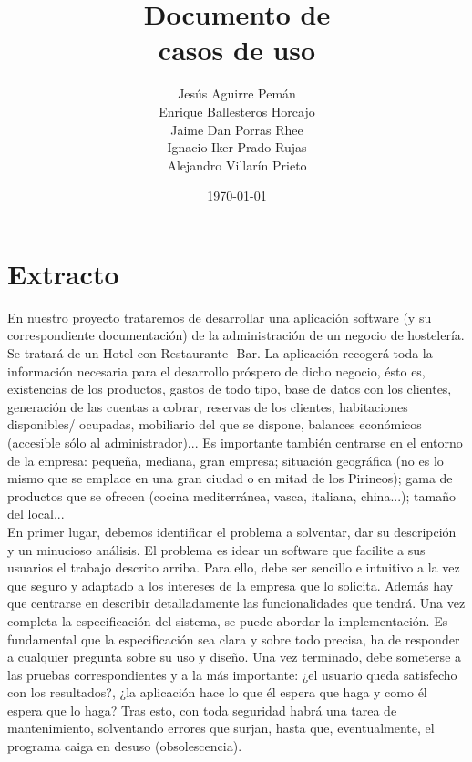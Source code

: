 \documentclass[spanish,a4paper,12pt]{report}		%
\begin{document}
\title{\textbf{\huge{Documento de \\ casos de uso}}}
\author{ Jesús Aguirre Pemán \\
	 Enrique Ballesteros Horcajo \\
	 Jaime Dan Porras Rhee \\
	 Ignacio Iker Prado Rujas \\
	 Alejandro Villarín Prieto }
\date{\today}
\maketitle

\newpage
\mbox{}
\thispagestyle{empty}


\tableofcontents 		%

\newpage
\mbox{}
\thispagestyle{empty}
\newpage

\part{Extracto} %
En nuestro proyecto trataremos de desarrollar una aplicación software (y su correspondiente documentación) de la administración de un negocio de hostelería. Se tratará de un Hotel con Restaurante- Bar. La aplicación recogerá toda la información necesaria para el desarrollo próspero de dicho negocio, ésto es, existencias de los productos, gastos de todo tipo, base de datos con los clientes, generación de las cuentas a cobrar, reservas de los clientes, habitaciones disponibles/ ocupadas, mobiliario del que se dispone, balances económicos (accesible sólo al administrador)... Es importante también centrarse en el entorno de la empresa: pequeña, mediana, gran empresa; situación geográfica (no es lo mismo que se emplace en una gran ciudad o en mitad de los Pirineos); gama de productos que se ofrecen (cocina mediterránea, vasca, italiana, china...); tamaño del local... \\

En primer lugar, debemos identificar el problema a solventar, dar su descripción y un minucioso análisis. El problema es idear un software que facilite a sus usuarios el trabajo descrito arriba. Para ello, debe ser sencillo e intuitivo a la vez que seguro y adaptado a los intereses de la empresa que lo solicita. Además hay que centrarse en describir detalladamente las funcionalidades que tendrá. Una vez completa la especificación del sistema, se puede abordar la implementación. Es fundamental que la especificación sea clara y sobre todo precisa, ha de responder a cualquier pregunta sobre su uso y diseño. Una vez terminado, debe someterse a las pruebas correspondientes y a la más importante: ¿el usuario queda satisfecho con los resultados?, ¿la aplicación hace lo que él espera que haga y como él espera que lo haga? Tras esto, con toda seguridad habrá una tarea de mantenimiento, solventando errores que surjan, hasta que, eventualmente, el programa caiga en desuso (obsolescencia).
\end{document}
